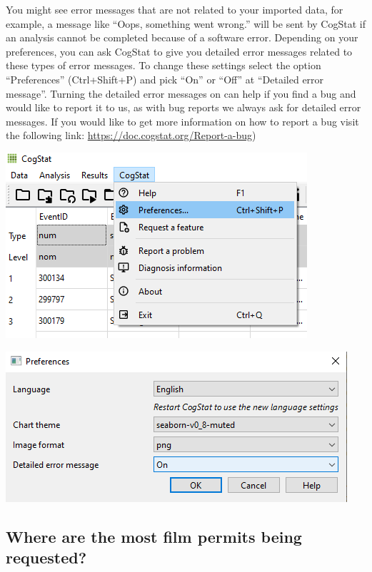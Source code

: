 \documentclass[
]{book}
\begin{document}
You might see error messages that are not related to your imported data, for example, a message like ``Oops, something went wrong.'' will be sent by CogStat if an analysis cannot be completed because of a software error. Depending on your preferences, you can ask CogStat to give you detailed error messages related to these types of error messages. To change these settings select the option ``Preferences'' (Ctrl+Shift+P) and pick ``On'' or ``Off'' at ``Detailed error message''. Turning the detailed error messages on can help if you find a bug and would like to report it to us, as with bug reports we always ask for detailed error messages.
If you would like to get more information on how to report a bug visit the following link: \url{https://doc.cogstat.org/Report-a-bug})

\includegraphics{img/ch1/preferences.png}

\includegraphics{img/ch1/detailederror.png}

\hypertarget{where-are-the-most-film-permits-being-requested-1}{%
\subsection{Where are the most film permits being requested?}\label{where-are-the-most-film-permits-being-requested-1}}
\end{document}
